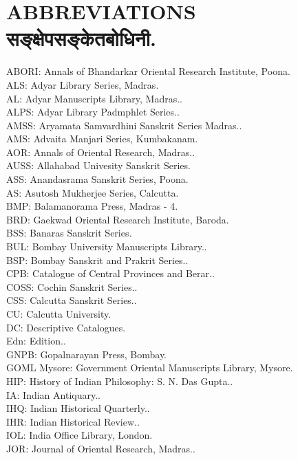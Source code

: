 ﻿\chapter{ABBREVIATIONS सङ्क्षेपसङ्केतबोधिनी.}

ABORI: Annals of Bhandarkar Oriental Research Institute, Poona.\\
ALS: Adyar Library Series, Madras.\.\\
AL: Adyar Manuscripts Library, Madras..\\
ALPS: Adyar Library Padmphlet Series..\\
AMSS: Aryamata Samvardhini Sanskrit Series Madras..\\
AMS: Advaita Manjari Series, Kumbakanam.\\
AOR: Annals of Oriental Research, Madras..\\
AUSS: Allahabad Univesity Sanskrit Series.\\
ASS: Anandasrama Sanskrit Series, Poona.\\
AS: Asutosh Mukherjee Series, Calcutta.\\
BMP: Balamanorama Press, Madras - 4.\\
BRD: Gaekwad Oriental Research Institute, Baroda.\\
BSS: Banaras Sanskrit Series.\\
BUL: Bombay University Manuscripts Library..\\
BSP: Bombay Sanskrit and Prakrit Series..\\
CPB: Catalogue of Central Provinces and Berar..\\
COSS: Cochin Sanskrit Series..\\
CSS: Calcutta Sanskrit Series..\\
CU: Calcutta University.\\
DC: Descriptive Catalogues.\\
Edn: Edition..\\
GNPB: Gopalnarayan Press, Bombay.\\
GOML Mysore: Government Oriental Manuscripts Library, Mysore.\\
HIP: History of Indian Philosophy: S. N. Das Gupta..\\
IA: Indian Antiquary..\\
IHQ: Indian Historical Quarterly..\\
IHR: Indian Historical Review..\\
IOL: India Office Library, London.\\
JOR: Journal of Oriental Research, Madras..\\

